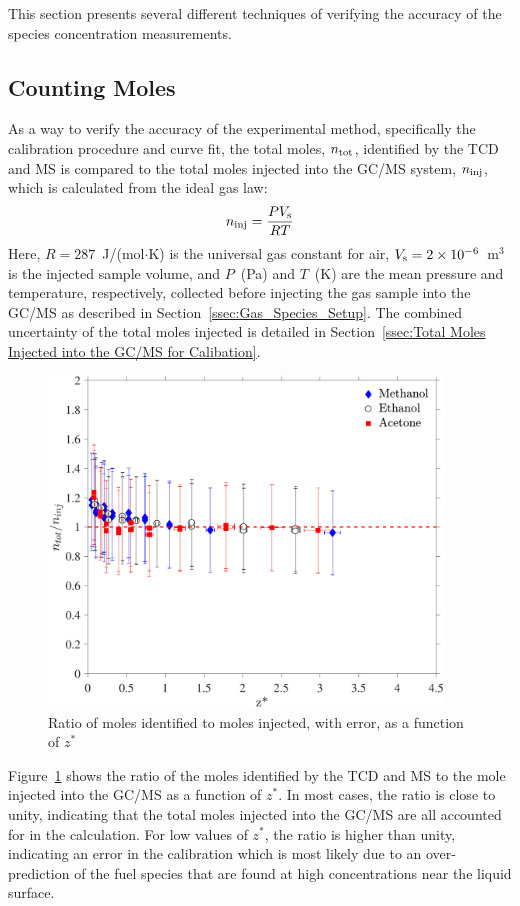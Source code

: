 \documentclass[12pt]{article}
\begin{document}
This section presents several different techniques of verifying the accuracy of the species concentration measurements.


\subsection{Counting Moles}

As a way to verify the accuracy of the experimental method, specifically the calibration procedure and curve fit, the total moles, $n_{\rm tot}$, identified by the TCD and MS is compared to the total moles injected into the GC/MS system, $n_{\rm inj}$, which is calculated from the ideal gas law:
\begin{equation}\label{eq:moles_inj}
n_{\rm inj}=\frac{PV_{\rm s}}{RT}
\end{equation}
Here, $R=287$~J/(mol$\cdot$K) is the universal gas constant for air, $V_{\rm s}=2\times 10^{-6}$~m$^3$ is the injected sample volume, and $P$~(Pa) and $T$~(K) are the mean pressure and temperature, respectively, collected before injecting the gas sample into the GC/MS as described in Section~\ref{ssec:Gas_Species_Setup}. The combined uncertainty of the total moles injected is detailed in Section~\ref{ssec:Total Moles Injected into the GC/MS for Calibation}.

\begin{figure}[h!]
	\centering
\includegraphics[width=10.5cm,keepaspectratio]{mole_ratio_Comparison.pdf}
	\caption[Ratio of moles identified to moles injected]{Ratio of moles identified to moles injected, with error, as a function of $z^*$}
	\label{fig:Mole_Comp}
\end{figure}

Figure~\ref{fig:Mole_Comp} shows the ratio of the moles identified by the TCD and MS to the mole injected into the GC/MS as a function of $z^*$. In most cases, the ratio is close to unity, indicating that the total moles injected into the GC/MS are all accounted for in the calculation. For low values of $z^*$, the ratio is higher than unity, indicating an error in the calibration which is most likely due to an over-prediction of the fuel species that are found at high concentrations near the liquid surface.
\end{document}
